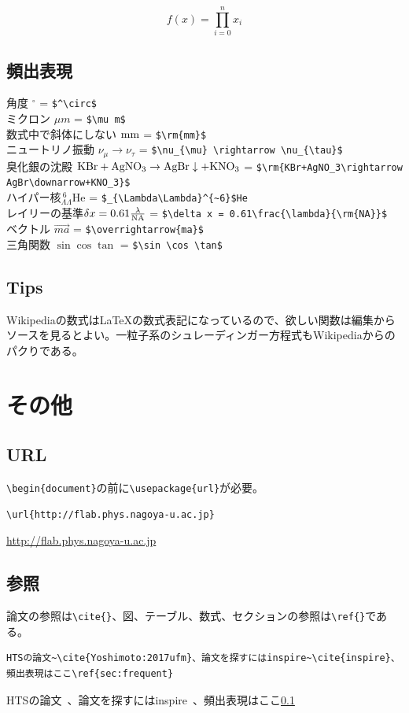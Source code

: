 \documentclass[a4j]{jsarticle}
\begin{document}
\begin{equation}  f(x) = \prod_{i=0}^n x_i \end{equation}
\subsection{頻出表現}
\label{sec:frequent}
\noindent
角度 $^\circ$ = \verb|$^\circ$|\\
ミクロン $\mu m$ = \verb|$\mu m$|\\
数式中で斜体にしない $\rm{mm}$ = \verb|$\rm{mm}$|\\
ニュートリノ振動 $\nu_{\mu} \rightarrow \nu_{\tau}$ = \verb|$\nu_{\mu} \rightarrow \nu_{\tau}$|\\
臭化銀の沈殿 $\rm{KBr+AgNO_3\rightarrow AgBr\downarrow+KNO_3}$ = \verb|$\rm{KBr+AgNO_3\rightarrow AgBr\downarrow+KNO_3}$|\\
ハイパー核$_{\Lambda\Lambda}^{~6}$He = \verb|$_{\Lambda\Lambda}^{~6}$He|\\
レイリーの基準$\delta x = 0.61\frac{\lambda}{\rm{NA}}$ = \verb|$\delta x = 0.61\frac{\lambda}{\rm{NA}}$|\\
ベクトル $\overrightarrow{ma}$ = \verb|$\overrightarrow{ma}$|\\
三角関数 $\sin \cos \tan$ = \verb|$\sin \cos \tan$|

\subsection{Tips}
Wikipediaの数式は\LaTeX  の数式表記になっているので、欲しい関数は編集からソースを見るとよい。一粒子系のシュレーディンガー方程式もWikipediaからのパクりである。
\newpage
\section{その他}
\subsection{URL}
\verb|\begin{document}|の前に\verb|\usepackage{url}|が必要。
\begin{verbatim}
\url{http://flab.phys.nagoya-u.ac.jp}
\end{verbatim}
\url{http://flab.phys.nagoya-u.ac.jp}

\subsection{参照}
論文の参照は\verb|\cite{}|、図、テーブル、数式、セクションの参照は\verb|\ref{}|である。
\begin{verbatim}
HTSの論文~\cite{Yoshimoto:2017ufm}、論文を探すにはinspire~\cite{inspire}、頻出表現はここ\ref{sec:frequent}
\end{verbatim}
HTSの論文~\cite{Yoshimoto:2017ufm}、論文を探すにはinspire~\cite{inspire}、頻出表現はここ\ref{sec:frequent}
\end{document}
